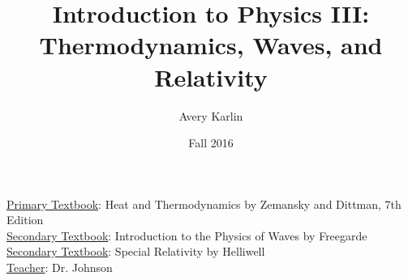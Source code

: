 \documentclass[11 pt, twoside]{article}
\begin{document}
\title{Introduction to Physics III: Thermodynamics, Waves, and Relativity}
\author{Avery Karlin}
\date{Fall 2016}
\newcommand{\textbook}{Heat and Thermodynamics by Zemansky and Dittman, 7th Edition}
\newcommand{\teacher}{Dr. Johnson}

\maketitle
\newpage
\hypertarget{content}{\tableofcontents}
\vspace{11pt}
\noindent
\underline{Primary Textbook}: \textbook\\
\underline{Secondary Textbook}: Introduction to the Physics of Waves by Freegarde \\
\underline{Secondary Textbook}: Special Relativity by Helliwell \\
\underline{Teacher}: \teacher
\newpage


\end{document}

